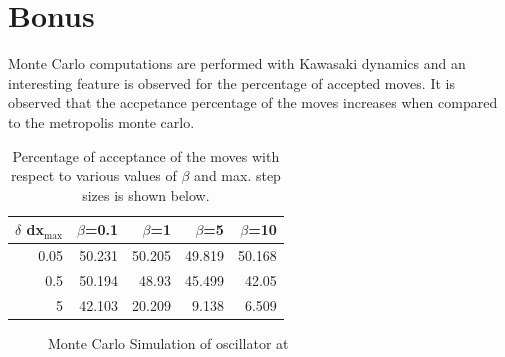 \documentclass{article}
\begin{document}
\section{Bonus}
\label{sec-3}

Monte Carlo computations are performed with Kawasaki dynamics and an interesting feature is observed for the percentage of accepted moves. It is observed that the accpetance percentage of the moves increases when compared to the metropolis monte carlo.

\begin{table}[htb]
\caption{\label{tab:table2}Percentage of acceptance of the moves with respect to various values of $\beta$ and  max. step sizes is shown below.}
\centering
\begin{tabular}{rrrrr}
\hline
$\delta$ dx$_{\text{max}}$ & $\beta$=0.1 & $\beta$=1 & $\beta$=5 & $\beta$=10\\
\hline
0.05 & 50.231 & 50.205 & 49.819 & 50.168\\
0.5 & 50.194 & 48.93 & 45.499 & 42.05\\
5 & 42.103 & 20.209 & 9.138 & 6.509\\
\hline
\end{tabular}
\end{table}

\begin{figure}[!tbp]
  \centering
{}
  \hfill
{}
  \caption{Monte Carlo Simulation of oscillator at }
\end{figure}
\end{document}

